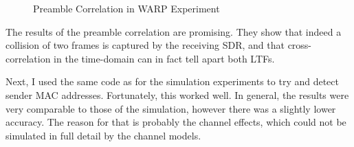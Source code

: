 \begin{figure}[H]
	\centering
	\setlength\figureheight{5cm}
	\setlength{}
	
	\caption{Preamble Correlation in WARP Experiment}
	\label{fig:warp_preamble_corr}
\end{figure}

The results of the preamble correlation are promising. They show that indeed a collision of two frames is captured by the receiving \gls{SDR}, and that cross-correlation in the time-domain can in fact tell apart both \glspl{LTF}.

Next, I used the same code as for the simulation experiments to try and detect sender MAC addresses. Fortunately, this worked well. In general, the results were very comparable to those of the simulation, however there was a slightly lower accuracy. The reason for that is probably the channel effects, which could not be simulated in full detail by the channel models.
